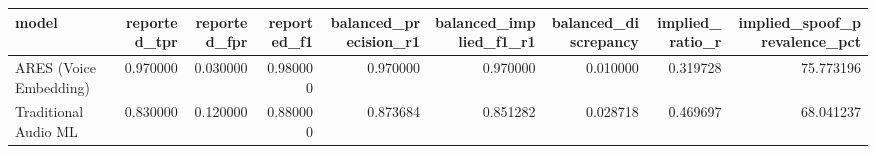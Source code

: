 \begin{tabular}{lrrrrrrrr}
\toprule
model & reported_tpr & reported_fpr & reported_f1 & balanced_precision_r1 & balanced_implied_f1_r1 & balanced_discrepancy & implied_ratio_r & implied_spoof_prevalence_pct \\
\midrule
ARES (Voice Embedding) & 0.970000 & 0.030000 & 0.980000 & 0.970000 & 0.970000 & 0.010000 & 0.319728 & 75.773196 \\
Traditional Audio ML & 0.830000 & 0.120000 & 0.880000 & 0.873684 & 0.851282 & 0.028718 & 0.469697 & 68.041237 \\
\bottomrule
\end{tabular}
